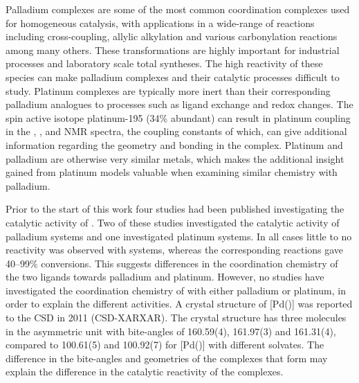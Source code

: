 Palladium complexes are some of the most common coordination complexes used for homogeneous catalysis, with applications in a wide-range of reactions including cross-coupling, allylic alkylation and various carbonylation reactions among many others.\cite{Dierkes1998, Freixa2003, Nicolaou2005, Peris2004, Shen2008, Suzuki1999, Wu2013}  These transformations are highly important for industrial processes and laboratory scale total syntheses.\cite{Simeone2010, Trost2012, Wagaw1999}  The high reactivity of these species can make palladium complexes and their catalytic processes difficult to study. Platinum complexes are typically more inert than their corresponding palladium analogues to processes such as ligand exchange and redox changes.\cite{Chianese2007}  The spin active isotope platinum-195 (34\% abundant) can result in platinum coupling in the \proton{}, \carbon{}, and \phosphorus{} NMR spectra, the coupling constants of which, can give additional information regarding the geometry and bonding in the complex.  Platinum and palladium are otherwise very similar metals, which makes the additional insight gained from platinum models valuable when examining similar chemistry with palladium.  

Prior to the start of this work four studies had been published investigating the catalytic activity of \tBuxantphos{}.\cite{Mispelaere2005, Dongol2007, Ohshima2009, Cabello2007}  Two of these studies investigated the catalytic activity of \tBuxantphos{} palladium systems and one investigated platinum systems.  In all cases little to no reactivity was observed with \tBuxantphos{} systems, whereas the corresponding \Phxantphos{} reactions gave 40--99\% conversions.  This suggests differences in the coordination chemistry of the two ligands towards palladium and platinum.  However, no studies have investigated the coordination chemistry of \tBuxantphos{} with either palladium or platinum, in order to explain the different activities.  A crystal structure of [Pd(\tBuxantphos)] was reported to the \gls{CSD} in 2011 (CSD-XARXAR).\cite{Allen2002}  The crystal structure has three molecules in the asymmetric unit with bite-angles of 160.59(4), 161.97(3) and 161.31(4)\degrees{}, compared to 100.61(5) and 100.92(7)\degrees{} for [Pd(\Phxantphos)] with different solvates.\cite{Allen2002,  Johns2006, Jahromi2012} The difference in the bite-angles and geometries of the complexes that form may explain the difference in the catalytic reactivity of the complexes.  

